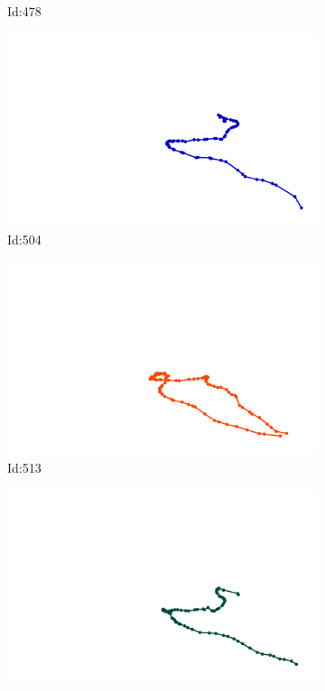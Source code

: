 \documentclass[12pt,twoside]{report}
\begin{document}
\begin{figure}
\begin{subfigure}[b]{0.20\textwidth}
\caption{Id:478}
\end{subfigure}
\begin{subfigure}[b]{0.20\textwidth}
\centering
\includegraphics[width=\textwidth]{../trajectories/504.png}
\caption{Id:504}
\end{subfigure}
\begin{subfigure}[b]{0.20\textwidth}
\centering
\includegraphics[width=\textwidth]{../trajectories/513.png}
\caption{Id:513}
\end{subfigure}
\begin{subfigure}[b]{0.20\textwidth}
\centering
\includegraphics[width=\textwidth]{../trajectories/524.png}

\end{subfigure}
\end{figure}
\end{document}
